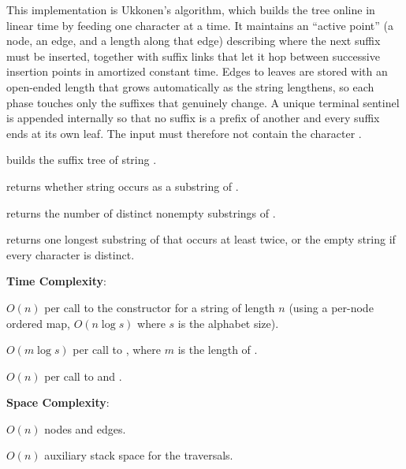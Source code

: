 This implementation is Ukkonen's algorithm, which builds the tree online in linear time by feeding one character at a time. It maintains an ``active point'' (a node, an edge, and a length along that edge) describing where the next suffix must be inserted, together with suffix links that let it hop between successive insertion points in amortized constant time. Edges to leaves are stored with an open-ended length that grows automatically as the string lengthens, so each phase touches only the suffixes that genuinely change. A unique terminal sentinel is appended internally so that no suffix is a prefix of another and every suffix ends at its own leaf. The input must therefore not contain the character \inlinecode{\textquotesingle{}\textbackslash{}1\textquotesingle{}}.

\begin{compactitem}
  \item {} builds the suffix tree of string .
  \item {} returns whether string  occurs as a substring of .
  \item {} returns the number of distinct nonempty substrings of .
  \item {} returns one longest substring of  that occurs at least twice, or the empty string if every character is distinct.
\end{compactitem}

\textbf{Time Complexity}:
\begin{compactitem}
  \item $O(n)$ per call to the constructor for a string of length $n$ (using a per-node ordered map, $O(n \log s)$ where $s$ is the alphabet size).
  \item $O(m \log s)$ per call to , where $m$ is the length of .
  \item $O(n)$ per call to  and .
\end{compactitem}

\textbf{Space Complexity}:
\begin{compactitem}
  \item $O(n)$ nodes and edges.
  \item $O(n)$ auxiliary stack space for the traversals.
\end{compactitem}

